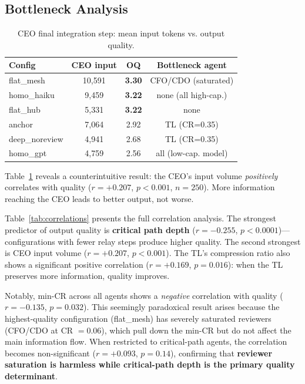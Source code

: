 \documentclass[conference]{IEEEtran}
\begin{document}
\subsection{Bottleneck Analysis}

\begin{table}[t]
\centering
\caption{CEO final integration step: mean input tokens vs. output quality.}
\label{tab:bottleneck}
\small
\begin{tabular}{lccc}
\toprule
\textbf{Config} & \textbf{CEO input} & \textbf{OQ} & \textbf{Bottleneck agent} \\
\midrule
flat\_mesh   & 10,591 & \textbf{3.30} & CFO/CDO (saturated) \\
homo\_haiku  & 9,459  & \textbf{3.22} & none (all high-cap.) \\
flat\_hub    & 5,331  & \textbf{3.22} & none \\
anchor       & 7,064  & 2.92          & TL (CR=0.35) \\
deep\_noreview & 4,941 & 2.68         & TL (CR=0.35) \\
homo\_gpt    & 4,759  & 2.56          & all (low-cap. model) \\
\bottomrule
\end{tabular}
\end{table}

Table~\ref{tab:bottleneck} reveals a counterintuitive result: the CEO's input volume \emph{positively} correlates with quality ($r = +0.207$, $p < 0.001$, $n = 250$).
More information reaching the CEO leads to better output, not worse.

Table~\ref{tab:correlations} presents the full correlation analysis.
The strongest predictor of output quality is \textbf{critical path depth} ($r = -0.255$, $p < 0.0001$)---configurations with fewer relay steps produce higher quality.
The second strongest is CEO input volume ($r = +0.207$, $p < 0.001$).
The TL's compression ratio also shows a significant positive correlation ($r = +0.169$, $p = 0.016$): when the TL preserves more information, quality improves.

Notably, min-CR across all agents shows a \emph{negative} correlation with quality ($r = -0.135$, $p = 0.032$).
This seemingly paradoxical result arises because the highest-quality configuration (flat\_mesh) has severely saturated reviewers (CFO/CDO at CR $= 0.06$), which pull down the min-CR but do not affect the main information flow.
When restricted to critical-path agents, the correlation becomes non-significant ($r = +0.093$, $p = 0.14$), confirming that \textbf{reviewer saturation is harmless while critical-path depth is the primary quality determinant}.
\end{document}
